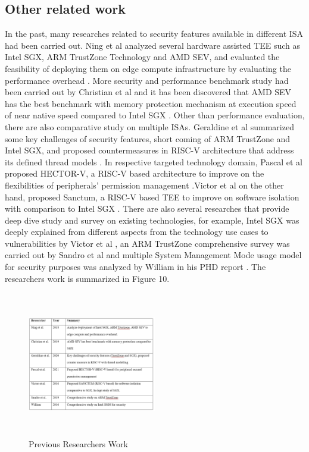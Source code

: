 \documentclass[a4paper,fleqn]{cas-dc}
\begin{document}
\subsection{ Other related work}
In the past, many researches related to security features available in different ISA had been carried out.
Ning et al analyzed several hardware assisted TEE such as Intel SGX, ARM TrustZone Technology
and AMD SEV, and evaluated the feasibility of deploying them on edge compute infrastructure by evaluating the performance overhead \cite{R5:2}.
More security and performance benchmark study had been carried out by Christian et al and it has been discovered that AMD SEV has the best benchmark with memory protection mechanism at execution speed of near native speed compared to Intel SGX \cite{R5:3}.
Other than performance evaluation, there are also comparative study on multiple ISAs. Geraldine et
al summarized some key challenges of security features, short coming of ARM TrustZone and Intel SGX, and proposed countermeasures in RISC-V architecture that address its defined thread models \cite{R5:4}.
In respective targeted technology domain, Pascal et al proposed HECTOR-V, a RISC-V based architecture to improve on the flexibilities of peripherals’ permission management \cite{R5:5}.Victor et al on the other hand, proposed Sanctum, a RISC-V based TEE to improve on software isolation with comparison to Intel SGX  \cite{R5:6}. There are also several researches that provide deep dive study and survey on existing technologies, for example, Intel SGX was deeply explained from different aspects from the technology use cases to vulnerabilities by Victor et al \cite{R5:7}, an ARM TrustZone comprehensive survey was carried out by Sandro et al \cite{R5:8} and multiple System Management Mode usage model for security purposes was analyzed by William in his PHD report \cite{R5:9}. The researchers work is summarized in Figure 10.

\begin{figure}[hbt!]
	\centering
	\includegraphics[width=0.5\textwidth,height=2.5in]{figs/PreviousResearchersWork.JPG}
	\caption{Previous Researchers Work}
\end{figure}
\end{document}

